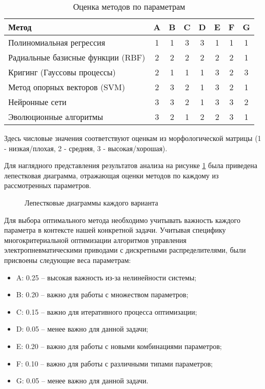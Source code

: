 \begin{table}[h]
    \centering
    \caption{Оценка методов по параметрам}
    \begin{tabular}{l|c|c|c|c|c|c|c}
        \midrule
        Метод                             & A & B & C & D & E & F & G \\
        \midrule
        Полиномиальная регрессия          & 1 & 1 & 3 & 3 & 1 & 1 & 1 \\
        \hline
        Радиальные базисные функции (RBF) & 2 & 2 & 2 & 2 & 2 & 2 & 1 \\
        \hline
        Кригинг (Гауссовы процессы)       & 2 & 1 & 1 & 1 & 3 & 2 & 3 \\
        \hline
        Метод опорных векторов (SVM)      & 2 & 3 & 2 & 1 & 3 & 2 & 1 \\
        \hline
        Нейронные сети                    & 3 & 3 & 2 & 1 & 3 & 3 & 2 \\
        \hline
        Эволюционные алгоритмы            & 3 & 2 & 1 & 2 & 2 & 3 & 1 \\
        \midrule
    \end{tabular}
    \label{tab:method_evaluation}
\end{table}

Здесь числовые значения соответствуют оценкам из
морфологической матрицы (1 - низкая/плохая, 2 - средняя, 3 - высокая/хорошая).

Для наглядного представления результатов анализа на рисунке \ref{fig:morphological_analysis}
была приведена лепестковая диаграмма, отражающая оценки методов по каждому из
рассмотренных параметров.

\begin{figure}[ht]
    \caption{Лепестковые диаграммы каждого варианта}\label{fig:morphological_analysis}
\end{figure}

Для выбора оптимального метода необходимо учитывать важность
каждого параметра в контексте нашей конкретной задачи.
Учитывая специфику многокритериальной оптимизации алгоритмов
управления электропневматическими приводами с дискретными
распределителями, были присвоены следующие веса параметрам:

\begin{itemize}
    \item A: 0.25 -- высокая важность из-за нелинейности системы;
    \item B: 0.20 -- важно для работы с множеством параметров;
    \item C: 0.15 -- важно для итеративного процесса оптимизации;
    \item D: 0.05 -- менее важно для данной задачи;
    \item E: 0.20 -- важно для работы с новыми комбинациями параметров;
    \item F: 0.10 -- важно для работы с различными типами параметров;
    \item G: 0.05 -- менее важно для данной задачи.
\end{itemize}


